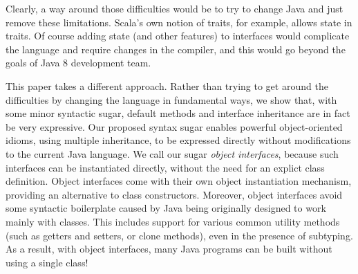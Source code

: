 \noindent Clearly, a way around those difficulties would be to try to
change Java and just remove these limitations. Scala's own
notion of traits, for example, allows state in traits. Of course adding
state (and other features) to interfaces would complicate the language
and require changes in the compiler, and this would go beyond the
goals of Java 8 development team.

This paper takes a different approach. Rather than trying to get
around the difficulties by changing the language in fundamental ways,
we show that, with some minor syntactic sugar, default methods and
interface inheritance are in fact be very expressive. Our proposed
syntax sugar enables powerful object-oriented idioms, using multiple
inheritance, to be expressed directly without modifications to the
current Java language. We call our sugar \emph{object interfaces},
because such interfaces can be instantiated directly, without the need
for an explict class definition. Object interfaces come with their own
object instantiation mechanism, providing an alternative to class
constructors. Moreover, object interfaces avoid some syntactic
boilerplate caused by Java being originally designed to work mainly
with classes. This includes support for various common utility methods
(such as getters and setters, or clone methods), even in the presence
of subtyping. As a result, with object interfaces, many Java programs
can be built without using a single class!  

